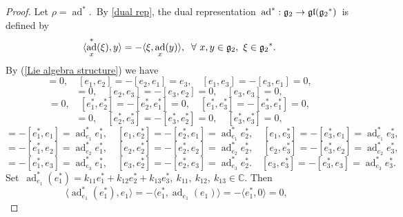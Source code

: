 \documentclass[12pt, reqno]{amsart}
\theoremstyle{plain}
\def \g  {\mathfrak{g}}   %
\def \gl {\mathfrak{gl}}
\DeclareMathOperator \ad { {\mathrm{ad}} }
\begin{document}
\begin{proof}
Let $\rho=\ad^{\ast}$.~By \eqref{dual rep},
the dual representation~$\ad^{\ast}: {\frak g_2} \rightarrow \gl({\frak g_2}^{\ast})$~is defined by
\begin{equation}
\langle \ad_x^*(\xi),y \rangle=-\langle\xi, \ad_x(y)\rangle, \;\;
\forall~x, y\in \g_2,~\xi \in {\frak g_2}^*.
\end{equation}
By (\ref{Lie algebra structure}) we have
\begin{equation*}
[e_1,e_1]=0,\quad[e_1,e_2]=-[e_2,e_1]=e_3,\quad[e_1,e_3]=-[e_3,e_1]=0,
\end{equation*}
\begin{equation*}
[e_2,e_2]=0,\quad[e_2,e_3]=-[e_3,e_2]=0,\quad[e_3,e_3]=0,
\end{equation*}
\begin{equation*}
[e^{\ast}_{1},e^{\ast}_{1}]=0,
\quad
[e^{\ast}_{1},e^{\ast}_{2}]=-[e^{\ast}_{2},e^{\ast}_{1}]=0,
\quad[e^{\ast}_{1},e^{\ast}_{3}]=-[e^{\ast}_{3},e^{\ast}_{1}]=0,
\end{equation*}
\begin{equation*}
[e^{\ast}_{2},e^{\ast}_{2}]=0,\quad
[e^{\ast}_{2},e^{\ast}_{3}]=-[e^{\ast}_{3},e^{\ast}_{2}]=0,
\quad[e^{\ast}_{3},e^{\ast}_{3}]=0,
\end{equation*}
\begin{equation*}
[e_1,e^{\ast}_{1}]=-[e^{\ast}_{1},e_1]=\ad_{e_1}^*e^{\ast}_{1},\quad
[e_1,e^{\ast}_{2}]=-[e^{\ast}_{2},e_1]=\ad_{e_1}^*e^{\ast}_{2},\quad
[e_1,e^{\ast}_{3}]=-[e^{\ast}_{3},e_1]=\ad_{e_1}^*e^{\ast}_{3},
\end{equation*}
\begin{equation*}
[e_2,e^{\ast}_{1}]=-[e^{\ast}_{1},e_2]=\ad_{e_2}^*e^{\ast}_{1},\quad
[e_2,e^{\ast}_{2}]=-[e^{\ast}_{2},e_2]=\ad_{e_2}^*e^{\ast}_{2},\quad
[e_2,e^{\ast}_{3}]=-[e^{\ast}_{3},e_2]=\ad_{e_2}^*e^{\ast}_{3},
\end{equation*}
\begin{equation*}
[e_3,e^{\ast}_{1}]=-[e^{\ast}_{1},e_3]=\ad_{e_3}^*e^{\ast}_{1},\quad
[e_3,e^{\ast}_{2}]=-[e^{\ast}_{2},e_3]=\ad_{e_3}^*e^{\ast}_{2}.\quad
[e_3,e^{\ast}_{3}]=-[e^{\ast}_{3},e_3]=\ad_{e_3}^*e^{\ast}_{3}.
\end{equation*}
Set~$\ad_{e_1}^*(e^{\ast}_{1})
=k_{11}e^{\ast}_{1}+k_{12}e^{\ast}_{2}+k_{13}e^{\ast}_{3},~k_{11},~k_{12},~k_{13}\in \mathbb{C}.$
Then
\begin{equation*}
\langle \ad_{e_1}^*(e^{\ast}_{1}),{e_1} \rangle=-\langle e^{\ast}_{1}, \ad_{e_1}(e_{1})\rangle=-\langle e^{\ast}_{1}, 0\rangle=0, \;\;

\end{equation*}
\end{proof}
\end{document}
